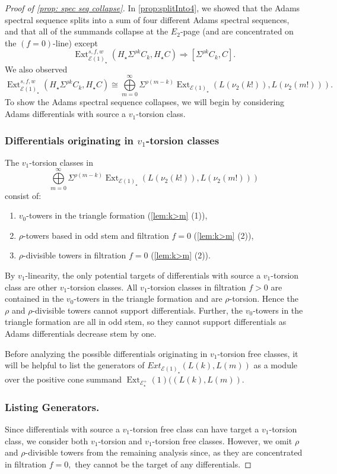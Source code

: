 \documentclass[10pt,a4paper]{amsart}
\DeclareMathOperator{\Ext}{Ext}
\newcommand{\cE}{{\mathcal E}}
\begin{document}
\begin{proof}[Proof of \cref{prop: spec seq collapse}]
In \cref{prop:splitInto4}, we showed that the Adams spectral sequence splits into a sum of four different Adams spectral sequences, and that all of the summands collapse at the $E_2$-page (and are concentrated on the $(f = 0)$-line) except  
\[ 
\Ext_{\mathcal{E}(1)_\star}^{s,f,w} (H_\star \Sigma^{\rho k}C_{k}, H_\star C) \Longrightarrow [\Sigma^{\rho k}C_{k}, C] .
\]
We also observed
\[ 
\Ext_{\mathcal{E}(1)_\star}^{s,f,w} (H_\star\Sigma^{\rho k} C_{k}, H_\star C) \cong  \bigoplus\limits_{m=0}^\infty \Sigma^{\rho (m-k)} \Ext_{\mathcal{E}(1)_\star} (L (\nu_2(k!)), L(\nu_2(m!))) .
\] 
To show the Adams spectral sequence collapses, we will begin by considering Adams differentials with source a $v_{1}$-torsion class.

\subsubsection{Differentials originating in $v_{1}$-torsion classes} The $v_{1}$-torsion classes in \[
\bigoplus\limits_{m=0}^\infty \Sigma^{\rho (m-k)} \Ext_{\mathcal{E}(1)_\star} (L (\nu_2(k!)), L(\nu_2(m!)))
\]
consist of: 
\begin{enumerate}
    \item $v_0$-towers in the triangle formation (\cref{lem:k>m} (1)),
    \item $\rho$-towers based in odd stem and filtration $f = 0$ (\cref{lem:k>m} (2)),
    \item $\rho$-divisible towers in filtration $f=0$ (\cref{lem:k>m} (2)). 
\end{enumerate} 

By $v_1$-linearity, the only potential targets of differentials with source a $v_1$-torsion class are other $v_1$-torsion classes. All $v_1$-torsion classes in filtration $f > 0$ are contained in the $v_0$-towers in the triangle formation and are $\rho$-torsion. Hence the $\rho$ and $\rho$-divisible towers cannot support differentials. Further, the $v_0$-towers in the triangle formation are all in odd stem, so they cannot support differentials as Adams differentials decrease stem by one. 

Before analyzing the possible differentials originating in $v_{1}$-torsion free classes, it will be helpful to list the generators of $Ext_{\cE(1)_{\star}}(L(k), L(m))$ as a module over the positive cone summand $\Ext_{\cE^{+}_\star}(1)((L(k), L(m))$. 
 
\subsubsection{Listing Generators.} Since differentials with source a $v_1$-torsion free class can have target a $v_1$-torsion class, we consider both $v_1$-torsion and $v_1$-torsion free classes. However, we omit $\rho$ and $\rho$-divisible towers from the remaining analysis since, as they are concentrated in filtration $f=0,$ they cannot be the target of any differentials.


\end{proof}
\end{document}
